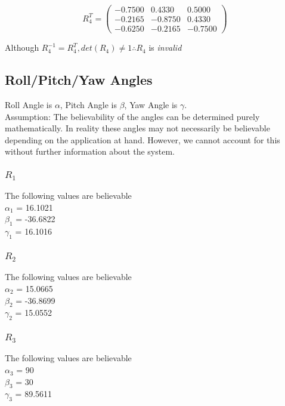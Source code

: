 			$$
			R_{4}^{T} =
			\begin{pmatrix}
				-0.7500 & 0.4330 & 0.5000\\
				-0.2165 & -0.8750 & 0.4330\\
				-0.6250  & -0.2165  & -0.7500
			\end{pmatrix}
			$$
					
			\hspace{30mm}Although $R_{4}^{-1} = R_{4}^{T}, det(R_{4}) \neq 1 \therefore R_{4}$ is \emph{invalid}
					
	\newpage
	\subsection{Roll/Pitch/Yaw Angles}
		Roll Angle is $\alpha$,
		Pitch Angle is $\beta$,
		Yaw Angle is $\gamma$.\\
	Assumption: The believability of the angles can be determined purely mathematically. In reality these angles may not necessarily be believable depending on the application at hand. However, we cannot account for this without further information about the system.
		\subsubsection{$R_{1}$}
		The following values are believable\\
			$\alpha_{1}$ = 16.1021\degree\\ 
			$\beta_{1}$ = -36.6822\degree\\ 
			$\gamma_{1}$ = 16.1016\degree\\
		\subsubsection{$R_{2}$}
		The following values are believable\\
			$\alpha_{2}$ = 15.0665\degree\\
			$\beta_{2}$ = -36.8699\degree\\
			$\gamma_{2}$ = 15.0552\degree\\
		\subsubsection{$R_{3}$}
		The following values are believable\\
			$\alpha_{3}$ = 90\degree\\
			$\beta_{3}$ = 30\degree\\
			$\gamma_{3}$ = 89.5611\degree\\

